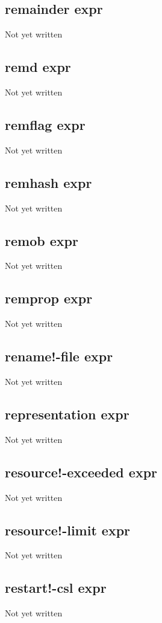 \documentclass[a4paper,11pt]{article}
\begin{document}
{\subsection{\ttfamily remainder expr}
   Not yet written

\subsection{\ttfamily remd expr}
   Not yet written

\subsection{\ttfamily remflag expr}
   Not yet written

\subsection{\ttfamily remhash expr}
   Not yet written

\subsection{\ttfamily remob expr}
   Not yet written

\subsection{\ttfamily remprop expr}
   Not yet written

\subsection{\ttfamily rename!-file expr}
   Not yet written

\subsection{\ttfamily representation expr}
   Not yet written

\subsection{\ttfamily resource!-exceeded expr}
   Not yet written

\subsection{\ttfamily resource!-limit expr}
   Not yet written

\subsection{\ttfamily restart!-csl expr}
   Not yet written

}
\end{document}
